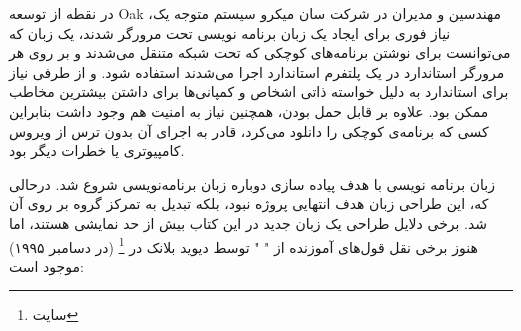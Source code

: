 \documentclass[a4paper,12pt]{report}
\begin{document}
	 در نقطه از توسعه Oak ،مهندسین و مدیران در شرکت سان میکرو سیستم متوجه یک نیاز فوری برای ایجاد یک زبان برنامه نویسی تحت مرورگر  شدند، 
	 یک زبان که می‌توانست برای نوشتن برنامه‌های کوچکی که تحت شبکه متنقل می‌شدند و بر روی هر مرورگر استاندارد در یک پلتفرم استاندارد اجرا می‌شدند استفاده شود.
	و از طرفی نیاز برای استاندارد به دلیل خواسته ذاتی اشخاص و کمپانی‌ها برای داشتن بیشترین مخاطب ممکن بود. علاوه بر قابل حمل بودن، همچنین نیاز به امنیت هم وجود داشت بنابراین کسی که برنامه‌ی کوچکی را دانلود می‌کرد، قادر به اجرای آن بدون ترس از ویروس کامپیوتری یا خطرات دیگر بود.
	
	زبان برنامه نویسی
  با هدف پیاده سازی دوباره زبان برنامه‌نویسی 
  شروع شد. درحالی که، این طراحی زبان هدف انتهایی پروژه نبود، بلکه تبدیل به تمرکز گروه بر روی آن شد.
  برخی دلایل طراحی یک زبان جدید در این کتاب بیش از حد نمایشی هستند، اما هنوز برخی نقل قول‌های آموزنده از "
	"
  توسط دیوید بلانک در 
	\footnote{
  سایت
	}
	(در دسامبر ۱۹۹۵) موجود است:
	
\end{document}
